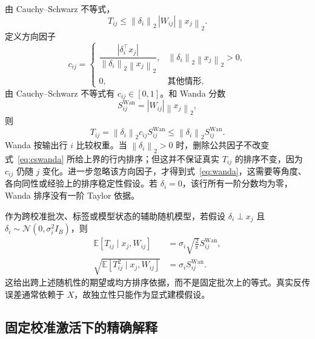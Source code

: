 \documentclass[conference,a4paper]{IEEEtran}
\newcommand{\E}{\mathbb{E}}
\newcommand{\norm}[1]{\left\lVert #1\right\rVert}
\begin{document}
由 Cauchy--Schwarz 不等式，
\begin{equation}
T_{ij}\leq\norm{\delta_i}_2\,|W_{ij}|\norm{x_j}_2.
\label{eq:cswanda}
\end{equation}
定义方向因子
\begin{equation}
c_{ij}=\begin{cases}
\dfrac{|\delta_i^\top x_j|}
{\norm{\delta_i}_2\norm{x_j}_2},
&\norm{\delta_i}_2\norm{x_j}_2>0,\\[1ex]
0,&\text{其他情形},
\end{cases}
\end{equation}
由 Cauchy--Schwarz 不等式有 $c_{ij}\in[0,1]$。和 Wanda 分数
\begin{equation}
S^{\mathrm{Wan}}_{ij}=|W_{ij}|\norm{x_j}_2,
\label{eq:wanda}
\end{equation}
则
\begin{equation}
\boxed{T_{ij}=\norm{\delta_i}_2c_{ij}S^{\mathrm{Wan}}_{ij}
\leq\norm{\delta_i}_2S^{\mathrm{Wan}}_{ij}.}
\label{eq:wandadecomp}
\end{equation}
Wanda 按输出行 $i$ 比较权重\cite{sun2024wanda}。当 $\norm{\delta_i}_2>0$ 时，删除公共因子不改变式~\eqref{eq:cswanda} 所给上界的行内排序；但这并不保证真实 $T_{ij}$ 的排序不变，因为 $c_{ij}$ 仍随 $j$ 变化。进一步忽略该方向因子，才得到式~\eqref{eq:wanda}，这需要等角度、各向同性或经验上的排序稳定性假设。若 $\delta_i=0$，该行所有一阶分数均为零，Wanda 排序没有一阶 Taylor 依据。

作为跨校准批次、标签或模型状态的辅助随机模型，若假设 $\delta_i\perp x_j$ 且 $\delta_i\sim\mathcal N(0,\sigma_i^2I_B)$，则
\begin{align}
\E[T_{ij}\mid x_j,W_{ij}]&=\sigma_i\sqrt{\frac{2}{\pi}}S^{\mathrm{Wan}}_{ij},\\
\sqrt{\E[T_{ij}^2\mid x_j,W_{ij}]}&=\sigma_iS^{\mathrm{Wan}}_{ij}.
\end{align}
这给出跨上述随机性的期望或均方排序依据，而不是固定批次上的等式。真实反传误差通常依赖于 $X$，故独立性只能作为显式建模假设。

\subsection{固定校准激活下的精确解释}
\end{document}
